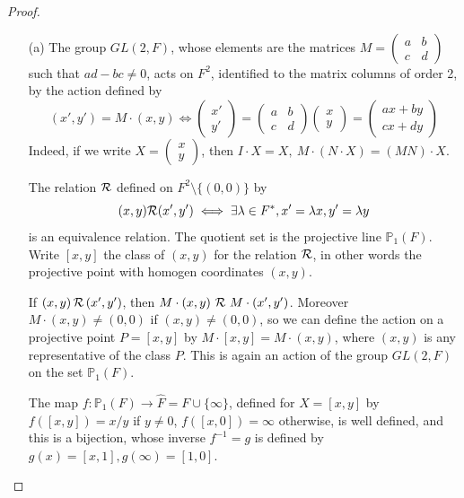 \documentclass[11pt,a4paper]{article}
\begin{document}
\begin{proof}
\begin{enumerate}
\item[(a)]
The group $GL(2,F)$, whose elements are the matrices 
$M =
\left(
\begin{array}{cc}
 a&   b   \\
 c&   d   
\end{array}
\right)
$ such that $ad-bc\neq 0$,
acts on $F^2$, identified to the matrix columns of order 2, by the action defined by 
$$(x',y') = M \cdot (x,y) \iff
 \left(
\begin{array}{c}
x'   \\
y'  
\end{array}
\right)
=
\left(
\begin{array}{cc}
 a&   b  \\
 c&   d   
\end{array}
\right)
\left(
\begin{array}{c}
x   \\
y   
\end{array}
\right)
=\left(
\begin{array}{c}
ax +by  \\
cx+dy  
\end{array}
\right) 
$$
Indeed, if we write 
$X=
\left(
\begin{array}{c}
x   \\
y   
\end{array}
\right)
$, then $I\cdot X=X,\  M\cdot (N\cdot X) = (MN)\cdot X$.

The relation $\cal{R}$ defined on $F^2 \setminus \{(0,0)\}$ by $$
(x,y)
{\cal R}
(x',y')
 \iff \exists \lambda \in F^*, x'=\lambda x,y'=\lambda y
 $$ 
 is an equivalence relation. The quotient set is the projective line $\mathbb{P}_1(F)$. Write $[x,y]$ the class of $(x,y)$ for the relation $\cal R$,  in other words the projective point with homogen coordinates $(x,y)$.

If $(x,y)\,  {\cal R}\,  (x',y')$, then $M\cdot (x,y)\ {\cal R}\  M\cdot (x',y')$. Moreover  $M\cdot (x,y) \neq (0,0)$ if $(x,y)\neq (0,0)$, so we can define the action on a projective point $P=[x,y]$ by $M\cdot [x,y] = M \cdot(x,y)$, where $(x,y)$ is any representative of the class $P$. This is again an action of the group $GL(2,F)$ on the set $\mathbb{P}_1(F)$.

The map $f : \mathbb{P}_1(F) \to \hat{F} = F \cup \{\infty\}$, defined for $X =  [x,y] $ by $f([x,y]) = x/y$ if $y\neq 0$, $f([x,0])=\infty$ otherwise, is well defined, and this is a bijection, whose inverse $f^{-1}=g$ is defined by $g(x) =[x,1],
g(\infty) = [1,0]
$.


\end{enumerate}
\end{proof}
\end{document}
